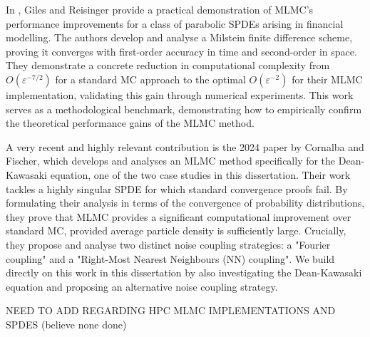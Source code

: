 In \cite{giles2012stochastic}, Giles and Reisinger provide a practical demonstration of 
MLMC's performance improvements for a class of parabolic SPDEs arising in financial modelling. 
The authors develop and analyse a Milstein finite difference scheme, proving it converges with 
first-order accuracy in time and second-order in space. They demonstrate a concrete reduction
in computational complexity from $O(\varepsilon^{-7/2})$ for a standard MC approach to the optimal 
$O(\varepsilon^{-2})$ for their MLMC implementation, validating this gain through 
numerical experiments. This work serves as a methodological benchmark, demonstrating how to 
empirically confirm the theoretical performance gains of the MLMC method.

A very recent and highly relevant contribution is the 2024 paper by 
Cornalba and Fischer, which 
develops and analyses an MLMC method specifically for the Dean-Kawasaki equation, 
one of the two case studies in this dissertation. Their work tackles a highly singular SPDE 
for which standard convergence proofs fail. By formulating their analysis in terms 
of the convergence of probability distributions, they prove that MLMC provides a 
significant computational improvement over standard MC, provided average 
particle density is sufficiently large. Crucially, they propose and 
analyse two distinct noise coupling strategies:
a "Fourier coupling" and a "Right-Most Nearest Neighbours (NN) coupling". We build directly
on this work in this dissertation by also investigating the Dean-Kawasaki equation and proposing 
an alternative noise coupling strategy.

NEED TO ADD REGARDING HPC MLMC IMPLEMENTATIONS AND SPDES (believe none done)




